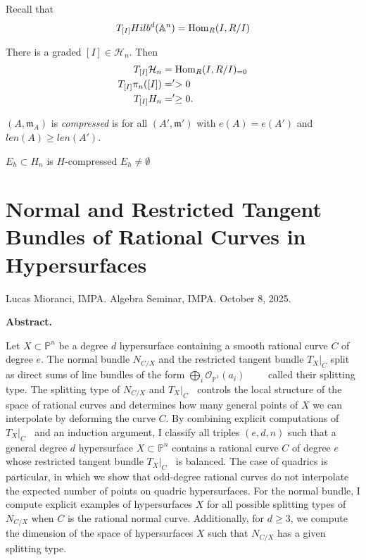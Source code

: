 Recall that
$$
T_{[I]}Hilb^d(\mathbb{A}^n)=\mathop{\mathrm{Hom}}\nolimits_R(I,R/I)
$$
\begin{theorem}[B-B,J,G G G L]
\label{theorem-B-B-J-G-G-G-L}
There is a graded $[I] \in \mathcal{H}_n$.
Then
\begin{align*}
T_{[I]}\mathcal{H}_n&=\mathop{\mathrm{Hom}}\nolimits_R(I,R/I)_{=0}\\
T_{[I]}\pi_n([I])&='>0\\
T_{[I]}H_n&=' \geq 0.
\end{align*}
\end{theorem}

\begin{definition}
\label{definition-compressed}
$(A,\mathfrak{m}_A)$ is {\it compressed} is for all  $(A',\mathfrak{m}')$ 
with $e(A)=e(A')$ and $len(A) \geq  len(A') $.
\end{definition}

\begin{theorem}
\label{theorem-E}
$E_h \subset H_n$ is $H$-compressed 
$E_h \neq  \emptyset$
\end{theorem}

\section{Normal and Restricted Tangent Bundles of Rational
Curves in Hypersurfaces}
\label{section-restricted-tangent-bundles}

\noindent
Lucas Mioranci, IMPA.
Algebra Seminar, IMPA. 
October 8, 2025.

\medskip
{\bf Abstract.} 

Let $X\subset \mathbb{P}^n$ be a degree $d$ hypersurface containing a smooth
rational curve $C$ of degree $e$. The normal bundle $N_{C/X}$ and the restricted
tangent bundle $T_X|_C$ split as direct sums of line bundles of the form
$\bigoplus_i \mathcal{O}_{\mathbb{P}^1}(a_i)\qquad$ called their splitting type.
The splitting type of $N_{C/X}$ and ${T_X}|_C\;\;$ controls the local structure
of the space of rational curves and determines how many general points of $X$ we
can interpolate by deforming the curve $C$. By combining explicit computations
of $T_X|_C\;\;$ and an induction argument, I classify all triples $(e,d,n)$ such
that a general degree $d$ hypersurface $X\subset \mathbb{P}^n$ contains a
rational curve $C$ of degree $e$ whose restricted tangent bundle ${T_X}|_C\;\;$
is balanced. The case of quadrics is particular, in which we show that
odd-degree rational curves do not interpolate the expected number of points on
quadric hypersurfaces.  For the normal bundle, I compute explicit examples of
hypersurfaces $X$ for all possible splitting types of $N_{C/X}$ when $C$ is the
rational normal curve. Additionally, for $d\ge 3$, we compute the dimension of
the space of hypersurfaces $X$ such that $N_{C/X}$ has a given splitting type.



